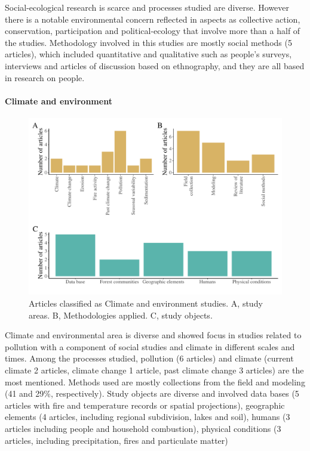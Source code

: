 \documentclass[]{article}
\let\oldparagraph\paragraph
\renewcommand{\paragraph}[1]{\oldparagraph{#1}\mbox{}}
\begin{document}
Social-ecological research is scarce and processes studied are diverse. However there is a notable environmental concern reflected in aspects as collective action, conservation, participation and political-ecology that involve more than a half of the studies. Methodology involved in this studies are mostly social methods (5 articles), which included quantitative and qualitative such as people's surveys, interviews and articles of discussion based on ethnography, and they are all based in research on people.

\hypertarget{climate-and-environment}{%
\paragraph{Climate and environment}\label{climate-and-environment}}

\begin{figure}
\centering
\includegraphics{Review_and_climate_files/figure-latex/Climate-1.pdf}
\caption{\label{fig:Climate}Articles classified as Climate and environment studies. A, study areas. B, Methodologies applied. C, study objects.}
\end{figure}

Climate and environmental area is diverse and showed focus in studies related to pollution with a component of social studies and climate in different scales and times. Among the processes studied, pollution (6 articles) and climate (current climate 2 articles, climate change 1 article, past climate change 3 articles) are the most mentioned. Methods used are mostly collections from the field and modeling (41 and 29\%, respectively). Study objects are diverse and involved data bases (5 articles with fire and temperature records or spatial projections), geographic elements (4 articles, including regional subdivision, lakes and soil), humans (3 articles including people and household combustion), physical conditions (3 articles, including precipitation, fires and particulate matter)
\end{document}
